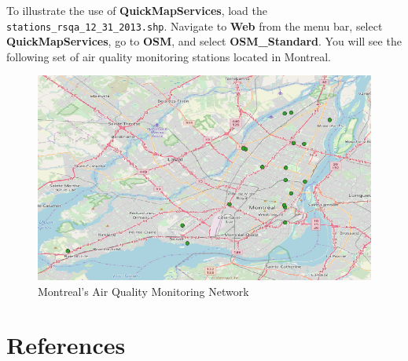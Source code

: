 \documentclass[]{book}
\theoremstyle{definition}
\theoremstyle{definition}
\theoremstyle{definition}
\theoremstyle{remark}
\begin{document}
To illustrate the use of \textbf{QuickMapServices}, load the
\texttt{stations\_rsqa\_12\_31\_2013.shp}. Navigate to \textbf{Web} from
the menu bar, select \textbf{QuickMapServices}, go to \textbf{OSM}, and
select \textbf{OSM\_Standard}. You will see the following set of air
quality monitoring stations located in Montreal.

\begin{figure}

{\centering \includegraphics[width=11.42in]{figures/BaseMaps_Example} 

}

\caption{Montreal's Air Quality Monitoring Network}\label{fig:unnamed-chunk-24}
\end{figure}

\chapter{References}\label{references}
\end{document}
